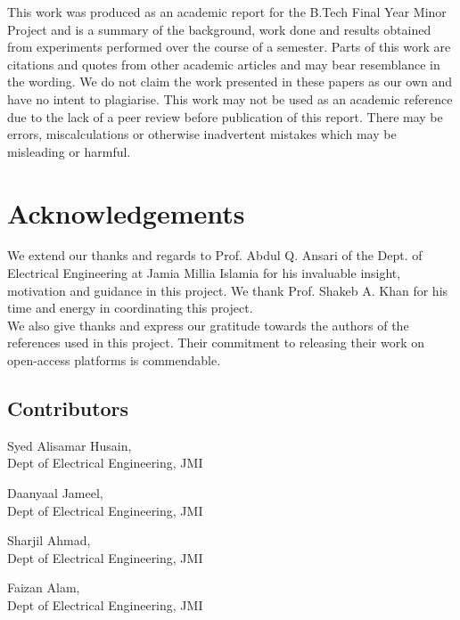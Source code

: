 \documentclass[a4paper]{article}
\begin{document}
  This work was produced as an academic report for the B.Tech Final Year Minor Project and
  is a summary of the background, work done and results obtained from experiments performed over
  the course of a semester.
  Parts of this work are citations and quotes from
  other academic articles and may bear resemblance in the wording. We do not claim the work
  presented in these papers as our own and have no intent to plagiarise.
  This work may not be used as an academic reference due to the lack of a peer review before 
  publication of this report. There may be errors, miscalculations or otherwise inadvertent
  mistakes which may be misleading or harmful.
  \vspace*{\fill}
  \thispagestyle{empty}

  \newpage
  \vspace*{1in}
  \section*{Acknowledgements}
  We extend our thanks and regards to Prof. Abdul Q. Ansari of the Dept. of Electrical Engineering 
  at Jamia Millia Islamia for his invaluable insight, motivation and guidance in this project.
  We thank Prof. Shakeb A. Khan for his time and energy in coordinating  this project.\\

  We also give thanks and express our gratitude towards the authors of the references used in this
  project. Their commitment to releasing their work on open-access platforms is commendable.

    \subsection*{Contributors}
    \begin{list}{}{}
      \item Syed Alisamar Husain,\\ Dept of Electrical Engineering, JMI
      \item Daanyaal Jameel,\\ Dept of Electrical Engineering, JMI
      \item Sharjil Ahmad,\\ Dept of Electrical Engineering, JMI
      \item Faizan Alam,\\ Dept of Electrical Engineering, JMI
    \end{list}
  \vspace*{\fill}
  \thispagestyle{empty}
\end{document}
